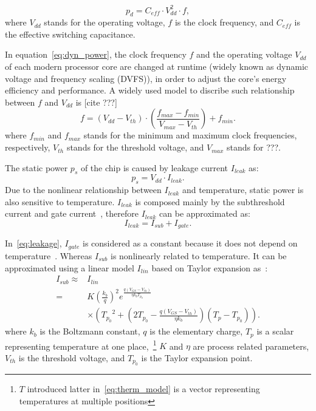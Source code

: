 \begin{equation}\label{eq:dyn_power}
p_{d} = C_{eff} \cdot V_{dd}^{2} \cdot f,
\end{equation}
where $V_{dd}$ stands for the operating voltage, $f$ is the clock frequency, and $C_{eff}$ is the effective switching capacitance.

In equation~\eqref{eq:dyn_power}, the clock frequency $f$ and the operating voltage $V_{dd}$ of each modern processor core are changed at runtime (widely known as dynamic voltage and frequency scaling (DVFS)), in order to adjust the core's energy efficiency and performance. 
A widely used model to discribe such relationship between $f$ and $V_{dd}$ is [cite ???]
\begin{equation}\label{eq:f_v}
f = (V_{dd}-V_{th}) \cdot (\frac{f_{max}-f_{min}}{V_{max}-V_{th}})+f_{min}.
\end{equation}
where $f_{min}$ and $f_{max}$ stands for the minimum and maximum clock frequencies, respectively, $V_{th}$ stands for the threshold voltage, and $V_{max}$ stands for ???.

The static power $p_{s}$ of the chip is caused by leakage current $I_{leak}$ as:
\begin{equation}\label{eq:sta_power}
p_{s} =V_{dd} \cdot I_{leak}.
\end{equation}
Due to the nonlinear relationship between $I_{leak}$ and temperature, static power is also sensitive to temperature. $I_{leak}$ is composed mainly by the subthreshold current and gate current~\cite{Liu:DATE'07,ShenTan:TODAES'12,WangWan:TOC'18}, therefore $I_{leak}$ can be approximated as:
\begin{equation}\label{eq:leakage}
I_{leak}=I_{sub}+I_{gate}.
\end{equation}

In~\eqref{eq:leakage}, $I_{gate}$ is considered as a constant because it does not depend on temperature~\cite{WangWan:TOC'18}. Whereas $I_{sub}$ is nonlinearly related to temperature. It can be approximated using a linear model $I_{lin}$ based on Taylor expansion as~\cite{WangWan:TOC'18}:
\begin{equation}\label{eq:sub_current_lin}
  \begin{split}
    I_{sub} \approx & I_{lin} \\
     =& K (\frac{k_b}{q})^2 e^{\frac{q(V_{GS}-V_{th})}{\eta k_b
    T_{p_0}}}\\
&\times ({T_{p_0}}^2 + (2T_{p_0} - \frac{q(V_{GS}-V_{th})}{\eta
  k_b})(T_p-T_{p_0})).
\end{split}
\end{equation}
where $k_b$ is the Boltzmann constant, $q$ is the elementary charge, $T_{p}$ is a scalar representing temperature at one place,~\footnote{$T$
introduced latter in~\eqref{eq:therm_model} is a vector representing temperatures at multiple positions} $K$ and $\eta$ are
process related parameters, $V_{th}$ is the threshold voltage, and $T_{p_0}$ is the Taylor expansion point.

